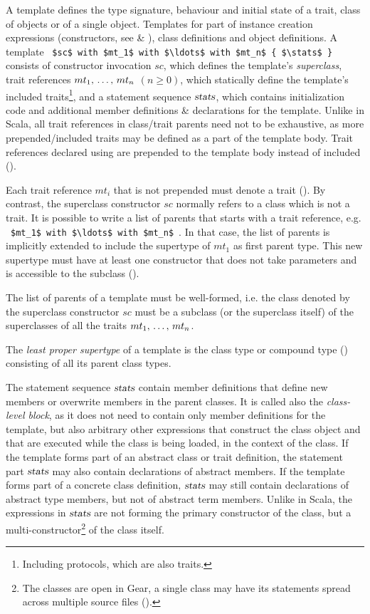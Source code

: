 A template defines the type signature, behaviour and initial state of a trait, class of objects or of a single object. Templates for part of instance creation expressions (constructors, see  \& ), class definitions and object definitions. A template ~\lstinline!$sc$ with $mt_1$ with $\ldots$ with $mt_n$ { $\stats$ }!~ consists of constructor invocation $sc$, which defines the template's {\em superclass}, trait references $mt_1 ,\, \ldots ,\, mt_n$ $(n \geq 0)$, which statically define the template's included traits\footnote{Including protocols, which are also traits.}, and a statement sequence $\mbox{\sl stats}$, which contains initialization code and additional member definitions \& declarations for the template. Unlike in Scala, all trait references in class/trait parents need not to be exhaustive, as more prepended/included traits may be defined as a part of the template body. Trait references declared using  are prepended to the template body instead of included (). 

Each trait reference $mt_i$ that is not prepended must denote a trait (). By contrast, the superclass constructor $sc$ normally refers to a class which is not a trait. It is possible to write a list of parents that starts with a trait reference, e.g. ~\lstinline!$mt_1$ with $\ldots$ with $mt_n$!~. In that case, the list of parents is implicitly extended to include the supertype of $mt_1$ as first parent type. This new supertype must have at least one constructor that does not take parameters and is accessible to the subclass (). 

The list of parents of a template must be well-formed, i.e. the class denoted by the superclass constructor $sc$ must be a subclass (or the superclass itself) of the superclasses of all the traits $mt_1 ,\, \ldots ,\, mt_n$. 

The {\em least proper supertype} of a template is the class type or compound type () consisting of all its parent class types. 

The statement sequence $\mbox{\sl stats}$ contain member definitions that define new members or overwrite members in the parent classes. It is called also the {\em class-level block}, as it does not need to contain only member definitions for the template, but also arbitrary other expressions that construct the class object and that are executed while the class is being loaded, in the context of the class. If the template forms part of an abstract class or trait definition, the statement part $\mbox{\sl stats}$ may also contain declarations of abstract members. If the template forms part of a concrete class definition, $\mbox{\sl stats}$ may still contain declarations of abstract type members, but not of abstract term members. Unlike in Scala, the expressions in $\mbox{\sl stats}$ are not forming the primary constructor of the class, but a multi-constructor\footnote{The classes are open in Gear, a single class may have its statements spread across multiple source files ().} of the class itself. 

